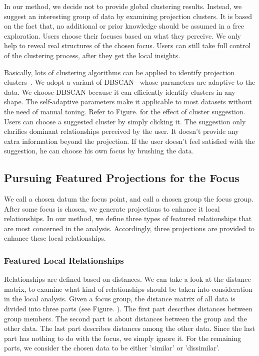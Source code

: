 In our method, we decide not to provide global clustering results. Instead, we suggest an interesting group of data by examining projection clusters. It is based on the fact that, no additional or prior knowledge should be assumed in a free exploration. Users choose their focuses based on what they perceive. We only help to reveal real structures of the chosen focus. Users can still take full control of the clustering process, after they get the local insights.

Basically, lots of clustering algorithms can be applied to identify projection clusters~\cite{DBLP:conf/ieeevast/Kandogan12}. We adopt a variant of DBSCAN~\cite{zhou2012research} whose parameters are adaptive to the data. We choose DBSCAN because it can efficiently identify clusters in any shape. The self-adaptive parameters make it applicable to most datasets without the need of manual toning. Refer to Figure. for the effect of cluster suggestion.  Users can choose a suggested cluster by simply clicking it. The suggestion only clarifies dominant relationships perceived by the user. It doesn't provide any extra information beyond the projection. If the user doesn't feel satisfied with the suggestion, he can choose his own focus by brushing the data.

\subsection{Pursuing Featured Projections for the Focus}
We call a chosen datum the focus point, and call a chosen group the focus group. After some focus is chosen, we generate projections to enhance it local relationships. In our method, we define three types of featured relationships that are most concerned in the analysis. Accordingly, three projections are provided to enhance these local relationships.

\subsubsection{Featured Local Relationships}
Relationships are defined based on distances. We can take a look at the distance matrix, to examine what kind of relationships should be taken into consideration in the local analysis. Given a focus group, the distance matrix of all data is divided into three parts (see Figure. ).  The first part describes distances between group members. The second part is about distances between the group and the other data. The last part describes distances among the other data. Since the last part has nothing to do with the focus, we simply ignore it. For the remaining parts, we consider the chosen data to be either 'similar' or 'dissimilar'.

